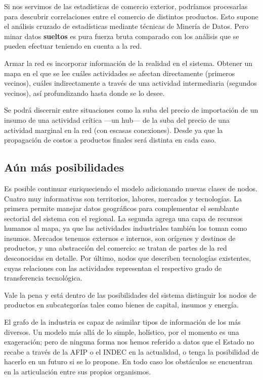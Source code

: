 \documentclass[a4paper]{report}
\begin{document}
Si nos servimos de las estadísticas de comercio exterior, podríamos procesarlas para descubrir correlaciones entre el comercio de distintos productos. Esto supone el análisis cruzado de estadísticas mediante técnicas de Minería de Datos. Pero minar datos \textbf{sueltos} es pura fuerza bruta comparado con los análisis que se pueden efectuar teniendo en cuenta a la red.

Armar la red es incorporar información de la realidad en el sistema. Obtener un mapa en el que se lee cuáles actividades se afectan directamente (primeros vecinos), cuáles indirectamente a través de una actividad intermediaria (segundos vecinos), así profundizando hasta donde se lo desee.

Se podrá discernir entre situaciones como la suba del precio de importación de un insumo de una actividad crítica —un hub— de la suba del precio de una actividad marginal en la red (con escasas conexiones). Desde ya que la propagación de costos a productos finales será distinta en cada caso.

\subsection*{Aún más posibilidades}

Es posible continuar enriqueciendo el modelo adicionando nuevas clases de nodos. Cuatro muy informativas son territorios, labores, mercados y tecnologías. La primera permite manejar datos geográficos para complementar el semblante sectorial del sistema con el regional. La segunda agrega una capa de recursos humanos al mapa, ya que las actividades industriales también los toman como insumos. Mercados tenemos externos e internos, son orígenes y destinos de productos, y una abstracción del comercio: se tratan de partes de la red desconocidas en detalle. Por último, nodos que describen tecnologías existentes, cuyas relaciones con las actividades representan el respectivo grado de transferencia tecnológica.

Vale la pena y está dentro de las posibilidades del sistema distinguir los nodos de productos en subcategorías tales como bienes de capital, insumos y energía.

El grafo de la industria es capaz de asimilar tipos de información de los más diversos. Un modelo más allá de lo simple, holístico, por el momento es una exageración; pero de ninguna forma nos hemos referido a datos que el Estado no recabe a través de la AFIP o el INDEC en la actualidad, o tenga la posibilidad de hacerlo en un futuro si se lo propone. En todo caso los obstáculos se encuentran en la articulación entre sus propios organismos.
\end{document}
